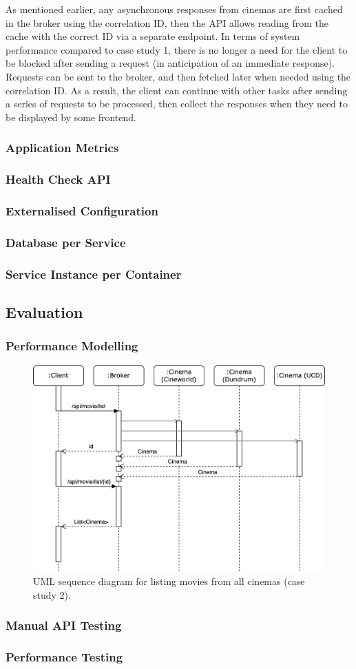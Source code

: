 As mentioned earlier, any asynchronous responses from cinemas are first cached in the broker using the correlation ID, then the API allows reading from the cache with the correct ID via a separate endpoint. In terms of system performance compared to case study 1, there is no longer a need for the client to be blocked after sending a request (in anticipation of an immediate response). Requests can be sent to the broker, and then fetched later when needed using the correlation ID. As a result, the client can continue with other tasks after sending a series of requests to be processed, then collect the responses when they need to be displayed by some frontend.


\subsubsection{Application Metrics}

\subsubsection{Health Check API}
\subsubsection{Externalised Configuration}
\subsubsection{Database per Service}
\subsubsection{Service Instance per Container}

\subsection{Evaluation}

\subsubsection{Performance Modelling}

\begin{figure}[H]
  \centering
  \includegraphics[width=0.75\linewidth]{./assets/diagrams/cs02-sequence.png}
  \caption{UML sequence diagram for listing movies from all cinemas (case study 2).}
  \label{fig:cs02-sequence}
\end{figure}

\subsubsection{Manual API Testing}
\subsubsection{Performance Testing}
